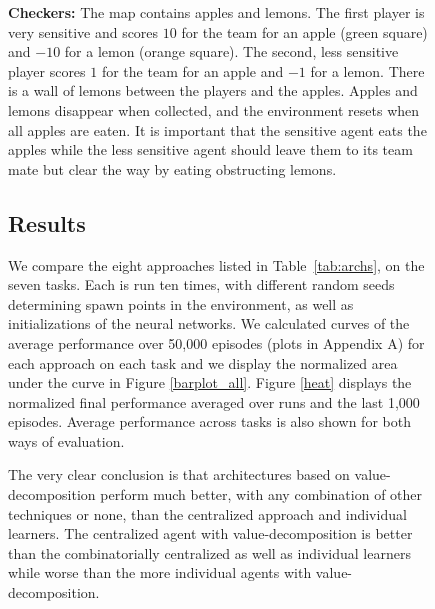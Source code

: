 \documentclass{article}
\begin{document}
\begin{figure}


{\bf Checkers:} 
The map contains apples and lemons. The first player is very sensitive and scores $10$ for the team for an apple (green square) and $-10$ for a lemon (orange square). The second, less sensitive player scores $1$ for the team for an apple and $-1$ for a lemon. There is a wall of lemons between the players and the apples. Apples and lemons disappear when collected, and the environment resets when all apples are eaten. It is important that the sensitive agent eats the apples while the less sensitive agent should leave them to its team mate but clear the way by eating obstructing lemons. 



\subsection{Results}

We compare the eight approaches listed in Table~\ref{tab:archs}, on the seven tasks. Each is run ten times, with different random seeds determining spawn points in the environment, as well as initializations of the neural networks. 
We calculated curves of the average performance over 50,000 episodes (plots in Appendix A) for each approach on each task and we display the normalized area under the curve in Figure \ref{barplot_all}. Figure \ref{heat} displays the normalized final performance averaged over runs and the last 1,000 episodes. Average performance across tasks is also shown for both ways of evaluation.

The very clear conclusion is that architectures based on value-decomposition perform much better, with any combination of other techniques or none, than the centralized approach and individual learners. The centralized agent with value-decomposition is better than the combinatorially centralized as well as individual learners while worse than the more individual agents with value-decomposition. 




\end{figure}
\end{document}
